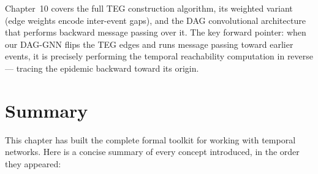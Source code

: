 Chapter~10 covers the full TEG construction algorithm, its weighted variant (edge weights encode
inter-event gaps), and the DAG convolutional architecture that performs backward message passing
over it. The key forward pointer: when our DAG-GNN flips the TEG edges and runs message passing
toward earlier events, it is precisely performing the temporal reachability computation in
reverse --- tracing the epidemic backward toward its origin.

\section{Summary}
\label{sec:tn_summary}

This chapter has built the complete formal toolkit for working with temporal networks. Here is
a concise summary of every concept introduced, in the order they appeared:

